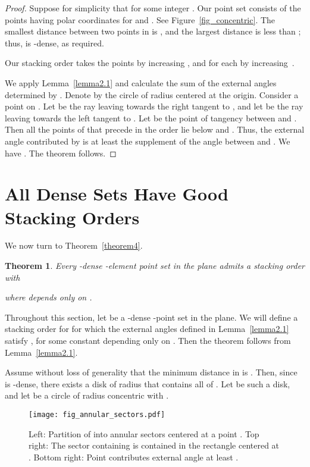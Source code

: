 \documentclass[11pt]{article}
\newtheorem{thm}{Theorem}             \newtheorem{lem}[thm]{Lemma}
\begin{document}
\begin{proof}
Suppose for simplicity that  for some integer . Our point set  consists of the points having polar coordinates
 for  and . See Figure~\ref{fig_concentric}. The smallest
distance between two points in  is , and the largest distance
is less than ; thus,  is -dense, as required.

Our stacking order  takes the points by increasing , and for each  by increasing~.

We apply Lemma~\ref{lemma2.1} and calculate the sum of
the external angles determined by . Denote by  the circle of radius  centered at the origin.
Consider a point  on . Let  be the ray leaving  towards the right tangent to , and let  be the ray leaving  towards the left tangent to . Let  be the point of tangency between  and . Then all the points of  that precede  in the order  lie below  and . Thus, the external angle  contributed by  is at
least the supplement  of the angle between  and . We have 
.
The theorem follows.
\end{proof}

\section{All Dense Sets Have Good Stacking Orders}

We now turn to Theorem~\ref{theorem4}.

{
\renewcommand{\thethm}{4}
\begin{thm} Every -dense -element point set  in the plane admits a stacking order  with

where  depends only on .
\end{thm}
\addtocounter{thm}{-1}
}

Throughout this section, let  be a -dense -point set
in the plane. We will define a stacking order  for  for
which the
external angles  defined in Lemma~\ref{lemma2.1} satisfy
, for some constant
 depending only on . Then the theorem follows from
Lemma~\ref{lemma2.1}.

Assume without loss of generality that the minimum  distance in
 is . Then, since  is -dense, there exists a disk
of radius  that contains all of . Let  be such
a disk, and let  be a circle of radius 
concentric with .

\begin{figure}
\centerline{\texttt{[image: fig\_annular\_sectors.pdf]}}
\caption{\label{fig_annular_sectors}Left: Partition of  into annular sectors
centered at a point . Top right: The sector containing  is contained in
the rectangle  centered at . Bottom right: Point  contributes
external angle at least .}
\end{figure}
\end{document}

